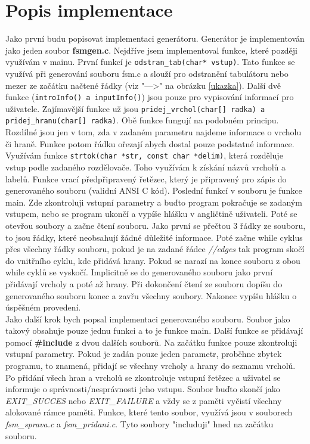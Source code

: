 \documentclass[czech,SP]{thesiskiv}
\begin{document}
\chapter{Popis implementace}
{Jako první budu popisovat implementaci generátoru. Generátor je implementován jako jeden soubor \textbf{fsmgen.c}. Nejdříve jsem implementoval funkce, které později využívám v mainu. První funkcí je \texttt{odstran\_tab(char* vstup)}. Tato funkce se využívá při generování souboru fsm.c a slouží pro odstranění tabulátoru nebo mezer ze začátku načtené řádky (viz "--->"  na obrázku \ref{ukazka}). Další dvě funkce (\texttt{introInfo() a inputInfo()}) jsou pouze pro vypisování informací pro uživatele. Zajímavější funkce už jsou \texttt{pridej\_vrchol(char[] radka) a pridej\_hranu(char[] radka)}. Obě funkce fungují na podobném principu. Rozdílné jsou jen v tom, zda v zadaném parametru najdeme informace o vrcholu či hraně. Funkce potom řádku ořezají abych dostal pouze podstatné informace. Využívám funkce \texttt{strtok(char *str, const char *delim)}, která rozděluje vstup podle zadaného rozdělovače. Toho využívám k získání názvů vrcholů a labelů. Funkce vrací předpřipravený řetězec, který je připravený pro zápis do generovaného souboru (validní ANSI C kód). Poslední funkcí v souboru je funkce main. Zde zkontroluji vstupní parametry a buďto program pokračuje se zadaným vstupem, nebo se program ukončí a vypíše hlášku v angličtině uživateli. Poté se otevřou soubory a začne čtení souboru. Jako první se přečtou 3 řádky ze souboru, to jsou řádky, které neobsahují žádné důležité informace. Poté začne while cyklus přes všechny řádky souboru, pokud je na zadané řádce \textit{//edges} tak program skočí do vnitřního cyklu, kde přidává hrany. Pokud se narazí na konec souboru z obou while cyklů se vyskočí. Implicitně se do generovaného souboru jako první přidávají vrcholy a poté až hrany. Při dokončení čtení ze souboru dopíšu do generovaného souboru konec a zavřu všechny soubory. Nakonec vypíšu hlášku o úspěšném provedení.} \\ 
{Jako další krok bych popsal implementaci generovaného souboru. Soubor jako takový obsahuje pouze jednu funkci a to je funkce main. Další funkce se přidávají pomocí \textbf{\#include} z dvou dalších souborů. Na začátku funkce pouze zkontroluji vstupní parametry. Pokud je zadán pouze jeden parametr, proběhne zbytek programu, to znamená, přidají se všechny vrcholy a hrany do seznamu vrcholů. Po přidání všech hran a vrcholů se zkontroluje vstupní řetězec a uživatel se informuje o správnosti/nesprávnosti jeho vstupu. Soubor buďto skončí jako \textit{EXIT\_SUCCES} nebo \textit{EXIT\_FAILURE} a vždy se z paměti vyčistí všechny alokované rámce paměti. Funkce, které tento soubor, využívá jsou v souborech \textit{fsm\_sprava.c} a \textit{fsm\_pridani.c}. Tyto soubory "includuji" hned na začátku souboru.}\\
\end{document}
